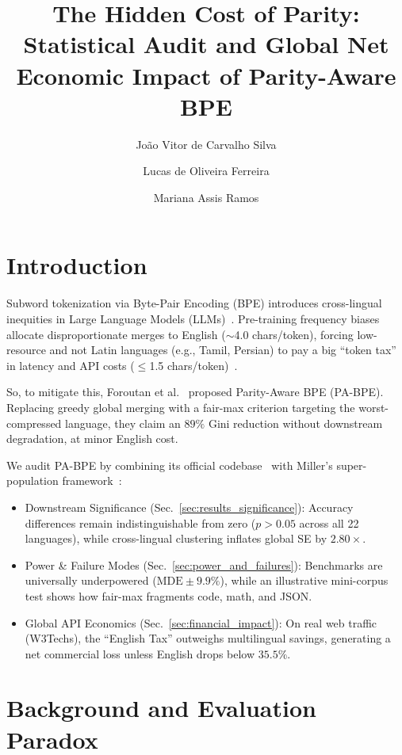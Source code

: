 \documentclass[sigconf,nonacm]{acmart}
\title{The Hidden Cost of Parity: Statistical Audit and Global Net Economic Impact of Parity-Aware BPE}
\author{João Vitor de Carvalho Silva}
\affiliation{}
\author{Lucas de Oliveira Ferreira}
\affiliation{}
\author{Mariana Assis Ramos}
\affiliation{}
\begin{document}
\maketitle

\section{Introduction}
\label{sec:intro}

Subword tokenization via Byte-Pair Encoding (BPE) introduces cross-lingual inequities in Large Language Models (LLMs)~\cite{petrov2023language,ahia2023all}. Pre-training frequency biases allocate disproportionate merges to English ($\sim$4.0 chars/token), forcing low-resource and not Latin languages (e.g., Tamil, Persian) to pay a big ``token tax'' in latency and API costs ($\le$1.5 chars/token)~\cite{ahia2023all,nllb2022no}.

So, to mitigate this, Foroutan et al.~\cite{foroutan2026parity} proposed {Parity-Aware BPE} (PA-BPE). Replacing greedy global merging with a {fair-max} criterion targeting the worst-compressed language, they claim an $89\%$ Gini reduction without downstream degradation, at minor English cost.

We audit PA-BPE by combining its official codebase~\cite{foroutan2026parity} with Miller's super-population framework~\cite{miller2024adding}:
\begin{itemize}[leftmargin=*, nosep, topsep=2pt]
    \item {Downstream Significance (Sec.~\ref{sec:results_significance}):} Accuracy differences remain indistinguishable from zero ($p > 0.05$ across all 22 languages), while cross-lingual clustering inflates global SE by $2.80\times$.
    \item {Power \& Failure Modes (Sec.~\ref{sec:power_and_failures}):} Benchmarks are universally underpowered ($\mathrm{MDE} \pm 9.9\%$), while an illustrative mini-corpus test shows how fair-max fragments code, math, and JSON.
    \item {Global API Economics (Sec.~\ref{sec:financial_impact}):} On real web traffic (W3Techs), the ``English Tax'' outweighs multilingual savings, generating a net commercial loss unless English drops below $35.5\%$.
\end{itemize}

\section{Background and Evaluation Paradox}
\label{sec:background}
\end{document}
